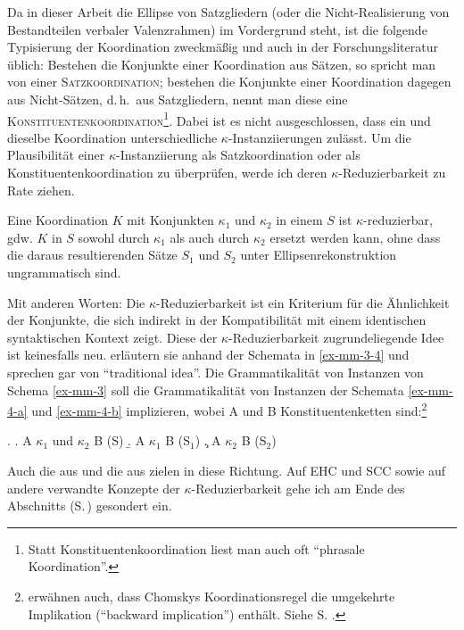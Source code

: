 Da in dieser Arbeit die Ellipse von Satzgliedern (oder die Nicht-Realisierung von Bestandteilen verbaler Valenzrahmen) im Vordergrund steht, ist die folgende Typisierung der Koordination zweckmä\ss ig und auch in der Forschungsliteratur üblich: Bestehen die Konjunkte einer Koordination aus Sätzen, so spricht man von einer \textsc{Satzkoordination}; bestehen die Konjunkte einer Koordination dagegen aus Nicht-Sätzen, d.\,h.\ aus Satzgliedern, nennt man diese eine \textsc{Konstituentenkoordination}\footnote{Statt Konstituentenkoordination liest man auch oft "`phrasale Koordination"'.}. Dabei ist es nicht ausgeschlossen, dass ein und dieselbe Koordination unterschiedliche $\kappa$-Instanziierungen zulässt. Um die Plausibilität einer $\kappa$-Instanziierung als Satzkoordination oder als Konstituentenkoordination zu überprüfen, werde ich deren $\kappa$-Reduzierbarkeit zu Rate ziehen.
\begin{definition} Eine Koordination $K$ mit Konjunkten $\kappa_1$ und $\kappa_2$ in einem  $S$ ist $\kappa$-reduzierbar, gdw. $K$ in $S$ sowohl durch $\kappa_1$ als auch durch $\kappa_2$ ersetzt werden kann, ohne dass die daraus resultierenden Sätze $S_1$ und $S_2$ unter Ellipsenrekonstruktion ungrammatisch sind.
\end{definition}
Mit anderen Worten: Die $\kappa$-Reduzierbarkeit ist ein Kriterium für die Ähnlichkeit der Konjunkte, die sich indirekt in der Kompatibilität mit einem identischen syntaktischen Kontext zeigt. Diese der $\kappa$-Reduzierbarkeit zugrundeliegende Idee ist keinesfalls neu. \cite{Maxwell:Manning:96} erläutern sie anhand der Schemata in \ref{ex-mm-3-4} und sprechen gar von "`traditional idea"'. Die Grammatikalität von Instanzen von Schema \ref{ex-mm-3} soll die Grammatikalität von Instanzen der Schemata \ref{ex-mm-4-a} und \ref{ex-mm-4-b} implizieren, wobei A und B Konstituentenketten sind:\footnote{\cite{Maxwell:Manning:96} erwähnen auch, dass Chomskys Koordinationsregel \citep[35]{Chomsky:57} die umgekehrte Implikation ("`backward implication"') enthält. Siehe S. \pageref{sec-koordinationsellipsen-5}.}

\ex. \label{ex-mm-3-4} 
\a. \label{ex-mm-3}A $\kappa_1$ und $\kappa_2$ B  \hfill	(S)\phantom{$_1$}
\b. \label{ex-mm-4-a}A $\kappa_1$ B \hfill (S$_1$)	
\c. \label{ex-mm-4-b}A $\kappa_2$ B \hfill (S$_2$)
   
Auch die  aus \citet{Hoehle:90,Hoehle:91} und die  aus \cite{Kathol:99} zielen in diese Richtung. Auf EHC und SCC sowie auf andere verwandte Konzepte der $\kappa$-Reduzierbarkeit gehe ich am Ende des Abschnitts (S.\,\pageref{sec-koordinationsellipsen-5}) gesondert ein. 

